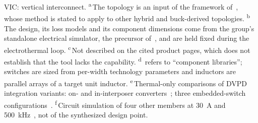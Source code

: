 \nopagebreak\noindent
VIC: vertical interconnect. \textsuperscript{a}\,The topology is an input of the framework
of~\cite{Krishnakumar2026DVPD}, whose method is stated to apply to other hybrid and buck-derived
topologies.
\textsuperscript{b}\,The design, its loss models and its component dimensions come from the
group's standalone electrical simulator, the precursor of~\cite{Krishnakumar2026DVPD}, and are
held fixed during the electrothermal loop. \textsuperscript{c}\,Not described on the cited product
pages, which does not establish that the tool lacks the capability.
\textsuperscript{d}\,\cite{Krishnakumar2026DVPD} refers to ``component libraries'';
switches are sized from per-width technology parameters and inductors are parallel arrays of a
target unit inductor. \textsuperscript{e}\,Thermal-only comparisons of
DVPD integration variants: on- and in-interposer converters~\cite{Choi2024ITherm}; three
embedded-switch configurations~\cite{Choi2025EmbeddedCooling}. \textsuperscript{f}\,Circuit
simulation of four other members at 30~A and 500~kHz~\cite{Abdelzaher2025ECTC,
Abdelzaher2026EPEPS}, not of the synthesized design point.\par
\endgroup
\medskip
